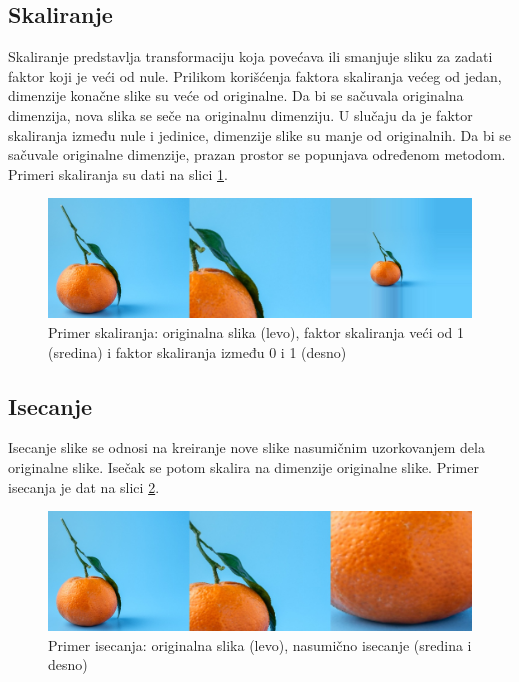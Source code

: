 \documentclass[12pt,oneside]{memoir}
\begin{document}
\subsection{Skaliranje}
Skaliranje predstavlja transformaciju koja povećava ili smanjuje sliku za zadati faktor koji je veći od nule. Prilikom korišćenja faktora skaliranja većeg od jedan, dimenzije konačne slike su veće od originalne. Da bi se sačuvala originalna dimenzija, nova slika se seče na originalnu dimenziju. U slučaju da je faktor skaliranja između nule i jedinice, dimenzije slike su manje od originalnih. Da bi se sačuvale originalne dimenzije, prazan prostor se popunjava određenom metodom. Primeri skaliranja su dati na slici \ref{fig:section3_scale}.

\begin{figure}[ht]
    \centering
    \includegraphics[width=1\textwidth]{matfmaster/glava3/scale.jpg}
    \caption{Primer skaliranja: originalna slika (levo), faktor skaliranja veći od 1 (sredina) i faktor skaliranja između 0 i 1 (desno) \cite{unsplashOrange}}
    \label{fig:section3_scale}
\end{figure}


\subsection{Isecanje}
Isecanje slike se odnosi na kreiranje nove slike nasumičnim uzorkovanjem dela originalne slike. Isečak se potom skalira na dimenzije originalne slike. Primer isecanja je dat na slici \ref{fig:section3_cut}.
 
\begin{figure}[ht]
    \centering
    \includegraphics[width=1\textwidth]{matfmaster/glava3/crop.jpg}
    \caption{Primer isecanja: originalna slika (levo), nasumično isecanje (sredina i desno) \cite{unsplashOrange}}
    \label{fig:section3_cut}
\end{figure}
\end{document}
